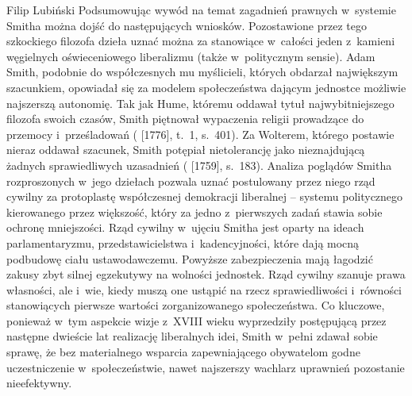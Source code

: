 \begin{artplenv}{Filip Lubiński}
Podsumowując wywód na temat zagadnień prawnych w~systemie Smitha można dojść do następujących wniosków.
Pozostawione przez tego szkockiego filozofa dzieła uznać można za stanowiące w~całości jeden z~kamieni węgielnych oświeceniowego
liberalizmu (także w~politycznym sensie). Adam Smith, podobnie do współczesnych mu myślicieli, których obdarzał
największym szacunkiem, opowiadał się za modelem społeczeństwa dającym jednostce możliwie najszerszą autonomię. Tak jak
Hume, któremu oddawał tytuł najwybitniejszego filozofa swoich czasów, Smith piętnował wypaczenia religii prowadzące do
przemocy i~prześladowań
(\cite{smith_badania_2007} [1776], t.~1, s.~401).
Za Wolterem, którego postawie
nieraz oddawał szacunek, Smith potępiał nietolerancję jako nieznajdującą żadnych sprawiedliwych uzasadnień
(\cite{smith_teoria_1989} [1759], s.~183).
Analiza poglądów Smitha rozproszonych w~jego dziełach pozwala
uznać postulowany przez niego rząd cywilny za protoplastę współczesnej demokracji liberalnej -- systemu politycznego
kierowanego przez większość, który za jedno z~pierwszych zadań stawia sobie ochronę mniejszości. Rząd cywilny w~ujęciu
Smitha jest oparty na ideach parlamentaryzmu, przedstawicielstwa i~kadencyjności, które dają mocną podbudowę ciału
ustawodawczemu. Powyższe zabezpieczenia mają łagodzić zakusy zbyt silnej egzekutywy na wolności jednostek. Rząd cywilny
szanuje prawa własności, ale i~wie, kiedy muszą one ustąpić na rzecz sprawiedliwości i~równości stanowiących pierwsze
wartości zorganizowanego społeczeństwa. Co kluczowe, ponieważ w~tym aspekcie wizje z~XVIII wieku wyprzedziły
postępującą przez następne dwieście lat realizację liberalnych idei, Smith w~pełni zdawał sobie sprawę, że bez
materialnego wsparcia zapewniającego obywatelom godne uczestniczenie w~społeczeństwie, nawet najszerszy wachlarz
uprawnień pozostanie nieefektywny.

\end{artplenv}\label{lub-stop}
